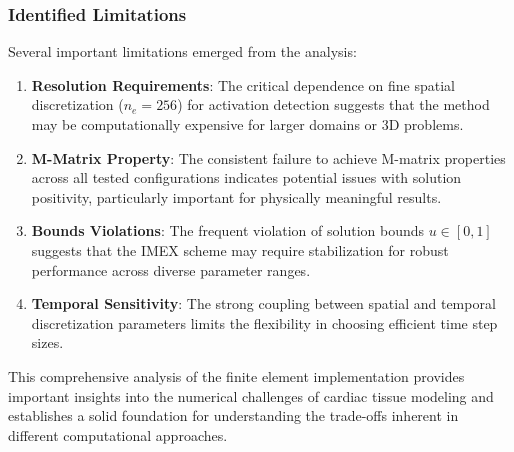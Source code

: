 \subsubsection*{Identified Limitations}

Several important limitations emerged from the analysis:

\begin{enumerate}
    \item \textbf{Resolution Requirements}: The critical dependence on fine spatial discretization ($n_e = 256$) for activation detection suggests that the method may be computationally expensive for larger domains or 3D problems.
    
    \item \textbf{M-Matrix Property}: The consistent failure to achieve M-matrix properties across all tested configurations indicates potential issues with solution positivity, particularly important for physically meaningful results.
    
    \item \textbf{Bounds Violations}: The frequent violation of solution bounds $u \in [0,1]$ suggests that the IMEX scheme may require stabilization for robust performance across diverse parameter ranges.
    
    \item \textbf{Temporal Sensitivity}: The strong coupling between spatial and temporal discretization parameters limits the flexibility in choosing efficient time step sizes.
\end{enumerate}

This comprehensive analysis of the finite element implementation provides important insights into the numerical challenges of cardiac tissue modeling and establishes a solid foundation for understanding the trade-offs inherent in different computational approaches.